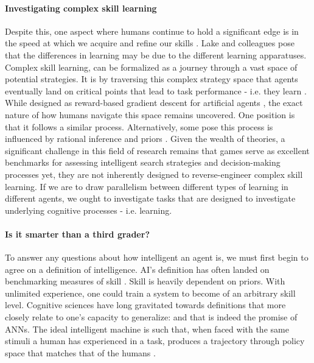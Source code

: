 \documentclass[11pt]{article}
\begin{document}
\paragraph{Investigating complex skill learning}
Despite this, one aspect where humans continue to hold a significant edge is in the speed at which we acquire and refine our skills \cite{tsividis2017human} \cite{lake2017building}. Lake and colleagues pose that the differences in learning may be due to the different learning apparatuses. Complex skill learning, can be formalized as a journey through a vast space of potential strategies. It is by traversing this complex strategy space that agents eventually land on critical points that lead to task performance - i.e. they learn \cite{ullman2012theory}. While designed as reward-based gradient descent for artificial agents \cite{mnih2015human}, the exact nature of how humans navigate this space remains uncovered. One position is that it follows a similar process. Alternatively, some pose this process is influenced by rational inference and priors \cite{tsividis2017human} \cite{DBLP:journals/corr/abs-1803-05252}.
Given the wealth of theories, a significant challenge in this field of research remains that games serve as excellent benchmarks for assessing intelligent search strategies and decision-making processes yet, they are not inherently designed to reverse-engineer complex skill learning. If we are to draw parallelism between different types of learning in different agents, we ought to investigate tasks that are designed to investigate underlying cognitive processes - i.e. learning.

\paragraph{Is it smarter than a third grader?}
To answer any questions about how intelligent an agent is, we must first begin to agree on a definition of intelligence. AI's definition has often landed on benchmarking measures of skill \cite{chollet2019measure}. Skill is heavily dependent on priors. With unlimited experience, one could train a system to become of an arbitrary skill level. Cognitive sciences have long gravitated towards definitions that more closely relate to one's capacity to generalize: and that is indeed the promise of ANNs. The ideal intelligent machine is such that, when faced with the same stimuli a human has experienced in a task, produces a trajectory through policy space that matches that of the humans \cite{van2019tasks}.
\end{document}

